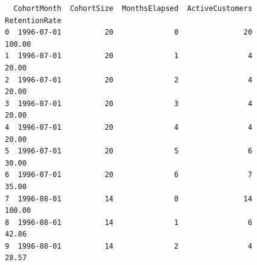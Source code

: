\documentclass[
  letterpaper,
  DIV=11,
  numbers=noendperiod]{scrartcl}
\begin{document}
\begin{verbatim}
  CohortMonth  CohortSize  MonthsElapsed  ActiveCustomers  RetentionRate
0  1996-07-01          20              0               20         100.00
1  1996-07-01          20              1                4          20.00
2  1996-07-01          20              2                4          20.00
3  1996-07-01          20              3                4          20.00
4  1996-07-01          20              4                4          20.00
5  1996-07-01          20              5                6          30.00
6  1996-07-01          20              6                7          35.00
7  1996-08-01          14              0               14         100.00
8  1996-08-01          14              1                6          42.86
9  1996-08-01          14              2                4          28.57
\end{verbatim}
\end{document}
